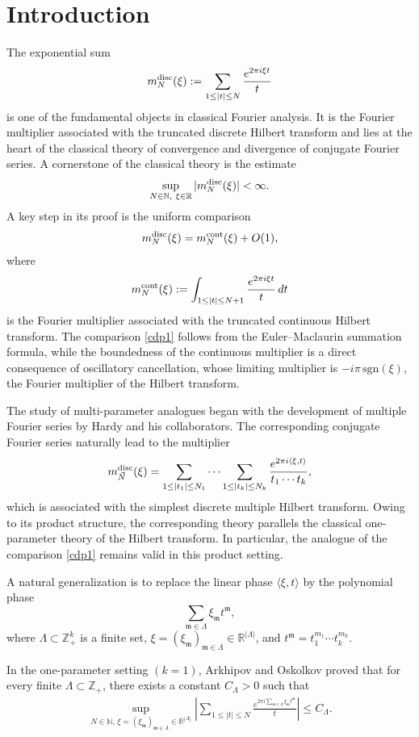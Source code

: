 \documentclass[11 pt,letterpaper]{amsart}
\theoremstyle{plain}
\theoremstyle{definition}
\theoremstyle{remark} \theoremstyle{exam} \theoremstyle{ob}
\numberwithin{equation}{section}
\begin{document}
  \section{Introduction}
The exponential sum
\[
m_N^{\rm disc}(\xi)
:=
\sum_{1\le |t|\le N}
\frac{e^{2\pi i\xi t}}{t}
\]
is one of the fundamental objects in classical Fourier analysis. It is
the Fourier multiplier associated with the truncated discrete Hilbert
transform and lies at the heart of the classical theory of convergence
and divergence of conjugate Fourier series. A cornerstone of the classical theory is the estimate
\[
\sup_{N\in\mathbb N,\ \xi\in\mathbb R}|m_N^{\rm disc}(\xi)|<\infty.
\]
A key step in its proof is the uniform comparison
\begin{align}\label{cdp1}
	m_N^{\rm disc}(\xi)
	=
	m_N^{\rm cont}(\xi)+O(1),
\end{align}
where
\[
m_N^{\rm cont}(\xi)
:=
\int_{1\le |t|\le N+1}
\frac{e^{2\pi i\xi t}}{t}\,dt
\]
is the Fourier multiplier associated with the truncated continuous
Hilbert transform. The comparison \eqref{cdp1} follows from the
Euler--Maclaurin summation formula, while the boundedness of the
continuous multiplier is a direct consequence of oscillatory
cancellation, whose limiting multiplier is
$-i\pi\, \mathrm{sgn}(\xi)$, the Fourier multiplier of the Hilbert
transform.


The study of multi-parameter analogues began with the development of
multiple Fourier series by Hardy and his collaborators. The
corresponding conjugate Fourier series naturally lead to the multiplier
\[
m_{\vec N}^{\rm disc}(\xi)=
\sum_{1\le |t_1|\le N_1}\cdots
\sum_{1\le |t_k|\le N_k}
\frac{e^{2\pi i\langle\xi,t\rangle}}
{t_1\cdots t_k},
\]
which is associated with the simplest discrete multiple Hilbert
transform.  Owing to its product structure, the corresponding theory
parallels the classical one-parameter theory of the Hilbert
transform. In particular, the analogue of the comparison \eqref{cdp1} remains valid in this product setting.

A natural generalization is to replace the linear phase
$\langle\xi,t\rangle$ by the polynomial phase
\[
\sum_{\mathfrak m\in\Lambda}
\xi_{\mathfrak m}t^{\mathfrak m},
\]
where $\Lambda\subset\mathbb Z_+^k$ is a finite set,
$\xi=(\xi_{\mathfrak m})_{\mathfrak m\in\Lambda}\in\mathbb R^{|\Lambda|}$,
and
$t^{\mathfrak m}=t_1^{m_1}\cdots t_k^{m_k}$.

In the one-parameter setting $(k=1)$, Arkhipov and Oskolkov \cite{AO}
proved that for every finite
$\Lambda\subset\mathbb Z_+$,
there exists a constant $C_\Lambda>0$ such that
\begin{align}\label{11}
	\sup_{N\in\mathbb N,\,
		\xi=(\xi_{\mathfrak m})_{\mathfrak m\in\Lambda}\in\mathbb R^{|\Lambda|}}
	\left|
	\sum_{1\le |t|\le N}
	\frac{
		e^{2\pi i
			\sum_{\mathfrak m\in\Lambda}
			\xi_{\mathfrak m}t^{\mathfrak m}}
	}{t}
	\right|
	\le C_\Lambda.
\end{align}
\end{document}
